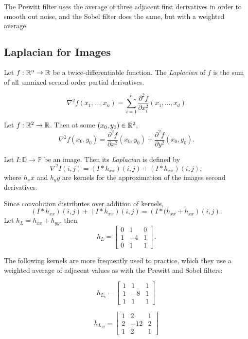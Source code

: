 The Prewitt filter uses the average of three adjacent first derivatives in order to smooth out noise, and the Sobel filter does the same, but with a weighted average.

\subsection{Laplacian for Images}

\begin{defn}
    Let $f: \mathbb{R}^n \to \mathbb{R}$ be a twice-differentiable function. The \emph{Laplacian} of $f$ is the sum of all unmixed second order partial derivatives.

    \[\nabla^2f(x_1, \ldots, x_n) = \sum_{i=1}^n \frac{\partial^2f}{\partial x_i^2}(x_1, \ldots, x_d)\]
\end{defn}

\begin{exmp}
    Let $f: \mathbb{R}^2 \to \mathbb{R}$. Then at some $(x_0, y_0) \in \mathbb{R}^2$, \[\nabla^2 f(x_0, y_0) = \frac{\partial^2f}{\partial x^2}(x_0, y_0) + \frac{\partial^2f}{\partial y^2}(x_0, y_0).\]
\end{exmp}

\begin{defn}
    Let $I: \mathbb{D} \to \mathbb{P}$ be an image. Then its \emph{Laplacian} is defined by \[\nabla^2I(i, j) = (I * h_{xx})(i, j) + (I * h_{xx})(i, j),\] where $h_xx$ and $h_yy$ are kernels for the approximation of the images second derivatives.
\end{defn}

Since convolution distributes over addition of kernels, \[(I * h_{xx})(i, j) + (I * h_{xx})(i, j) = \left(I * (h_{xx} + h_{xx}\right)(i, j).\] Let $h_L = h_{xx} + h_{yy}$, then
\[h_L = \begin{bmatrix}
    0 & 1 & 0 \\ 1 & -4 & 1 \\ 0 & 1 & 1
\end{bmatrix}.\]

The following kernels are more frequently used to practice, which they use a weighted average of adjacent values as with the Prewitt and Sobel filters:

\[h_{L_8} = \begin{bmatrix}
    1 & 1 & 1 \\ 1 & -8 & 1 \\ 1 & 1 & 1
\end{bmatrix}\]

\[h_{L_12} = \begin{bmatrix}
    1 & 2 & 1 \\ 2 & -12 & 2 \\ 1 & 2 & 1
\end{bmatrix}\]

